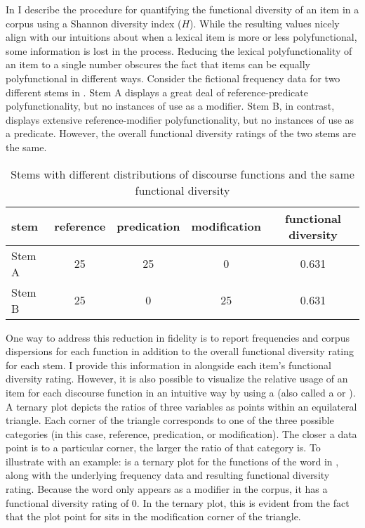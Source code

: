 In  I describe the procedure for quantifying the functional diversity of an item in a corpus using a Shannon diversity index ($H$). While the resulting values nicely align with our intuitions about when a lexical item is more or less polyfunctional, some information is lost in the process. Reducing the lexical polyfunctionality of an item to a single number obscures the fact that items can be equally polyfunctional in different ways. Consider the fictional frequency data for two different stems in . Stem A displays a great deal of reference-predicate polyfunctionality, but no instances of use as a modifier. Stem B, in contrast, displays extensive reference-modifier polyfunctionality, but no instances of use as a predicate. However, the overall functional diversity ratings of the two stems are the same.

\begin{table}[h!]
  \centering
  \caption{Stems with different distributions of discourse functions and the same functional diversity}
  \label{tab:equal-polyfunctional-stems}
  \begin{tabular}{ l c c c c }
    \toprule
    stem   & reference & predication & modification & functional diversity\\
    \midrule
    Stem A & 25        & 25          & 0            & 0.631      \\
    Stem B & 25        & 0           & 25           & 0.631      \\
    \bottomrule
  \end{tabular}
\end{table}

One way to address this reduction in fidelity is to report frequencies and corpus dispersions for each function in addition to the overall functional diversity rating for each stem. I provide this information in  alongside each item's functional diversity rating. However, it is also possible to visualize the relative usage of an item for each discourse function in an intuitive way by using a  (also called a  or ). A ternary plot depicts the ratios of three variables as points within an equilateral triangle. Each corner of the triangle corresponds to one of the three possible categories (in this case, reference, predication, or modification). The closer a data point is to a particular corner, the larger the ratio of that category is. To illustrate with an example:  is a ternary plot for the functions of the word  in , along with the underlying frequency data and resulting functional diversity rating. Because the word  only appears as a modifier in the corpus, it has a functional diversity rating of $0$. In the ternary plot, this is evident from the fact that the plot point for  sits in the modification corner of the triangle.

